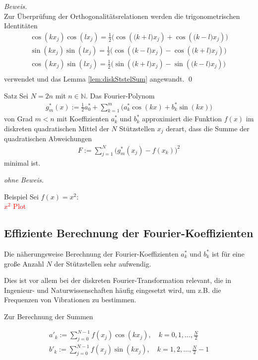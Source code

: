 \textit{Beweis.} \\
Zur Überprüfung der Orthogonalitätsrelationen werden die trigonometrischen Identitäten
\begin{align*}
  \cos(kx_j)\cos(lx_j) = \tfrac{1}{2}\Big(\cos(\big(k+l\big)x_j) + \cos(\big(k-l\big)x_j)\Big) \\
  \sin(kx_j)\sin(lx_j) = \tfrac{1}{2}\Big(\cos(\big(k-l\big)x_j) - \cos(\big(k+l\big)x_j)\Big) \\
  \cos(kx_j)\sin(lx_j) = \tfrac{1}{2}\Big(\sin(\big(k+l\big)x_j) - \sin(\big(k-l\big)x_j)\Big) \\
\end{align*}
verwendet und das Lemma \ref{lem:diskStstelSum} angewandt.
\qed 

\begin{colbox}{Satz}
  Sei $N=2n$ mit $n\in\mathbb{N}$. Das Fourier-Polynom
  \begin{align*}
  g_m^*(x) := \tfrac{1}{2}a^*_0 + \sum_{k=1}^{m}\Big(a^*_k\cos(kx)+b^*_k\sin(kx)\Big)
  \end{align*}
  von Grad $m<n$ mit Koeffizienten $a_k^*$ und $b^*_k$ approximiert die Funktion $f(x)$ im diskreten quadratischen 
  Mittel der $N$ Stützstellen $x_j$ derart, dass die Summe der quadratischen Abweichungen 
  \begin{align*}
    F:=\sum_{j=1}^{N}\Big(g^*_m(x_j)-f(x_k)\Big)^2
  \end{align*}
  minimal ist.
\end{colbox}
\textit{ohne Beweis.}


\begin{colbox}{Beispiel}
  Sei $f(x)=x^2$: \\
  \textcolor{red}{$x^2$ Plot} 
\end{colbox}

\subsection{Effiziente Berechnung der Fourier-Koeffizienten}
Die näherungsweise Berechnung der Fourier-Koeffizienten $a_k^*$ und $b_k^*$ ist für eine große Anzahl $N$ der 
Stützstellen sehr aufwendig. 

Dies ist vor allem bei der diskreten Fourier-Transformation relevant, die in Ingenieur- und Naturwissenschaften 
häufig eingesetzt wird, um z.B. die Frequenzen von Vibrationen zu bestimmen. 

Zur Berechnung der Summen 

%
\begin{align*}
  a'_k := \sum_{j=0}^{N-1} f(x_j)\cos(kx_j), \quad k=0,1,\dots,\tfrac{N}{2} \\
  b'_k := \sum_{j=0}^{N-1} f(x_j)\sin(kx_j), \quad k=1,2,\dots,\tfrac{N}{2}-1 
  \tag{1}\label{eq:fftEQ1}
\end{align*}
%

